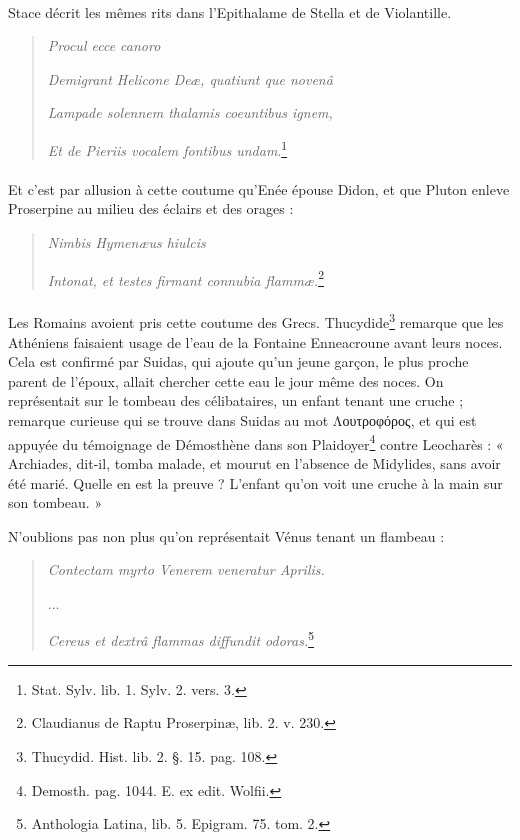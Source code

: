 \documentclass[a4paper, 11pt, oneside, polutonikogreek, french]{article}
\begin{document}
\paragraph{}
Stace décrit les mêmes rits dans l'Epithalame de Stella et de Violantille.
\begin{quotation}
\hspace*{10mm}\emph{Procul ecce canoro}

\emph{Demigrant Helicone Deæ, quatiunt que novenâ}

\emph{Lampade solennem thalamis coeuntibus ignem,}

\emph{Et de Pieriis vocalem fontibus undam}.\footnote{Stat. Sylv. lib. 1. Sylv. 2. vers. 3.}
\end{quotation}
\paragraph{}
Et c'est par allusion à cette coutume qu'Enée épouse Didon, et que Pluton enleve Proserpine au milieu des éclairs et des orages :
\begin{quotation}
\hspace*{10mm}\emph{Nimbis Hymenæus hiulcis}

\emph{Intonat, et testes firmant connubia flammæ.}\footnote{Claudianus de Raptu Proserpinæ, lib. 2. v. 230.}
\end{quotation}
\paragraph{}
Les Romains avoient pris cette coutume des Grecs. Thucydide\footnote{Thucydid. Hist. lib. 2. §. 15. pag. 108.} remarque que les Athéniens faisaient usage de l'eau de la Fontaine Enneacroune avant leurs noces. Cela est confirmé par Suidas, qui ajoute qu'un jeune garçon, le plus proche parent de l'époux, allait chercher cette eau le jour même des noces. On représentait sur le tombeau des célibataires, un enfant tenant une cruche ; remarque curieuse qui se trouve dans Suidas au mot Λουτροφόρος, et qui est appuyée du témoignage de Démosthène dans son Plaidoyer\footnote{Demosth. pag. 1044. E. ex edit. Wolfii.} contre Leocharès : « Archiades, dit-il, tomba malade, et mourut en l'absence de Midylides, sans avoir été marié. Quelle en est la preuve ? L'enfant qu'on voit une cruche à la main sur son tombeau. »

N'oublions pas non plus qu'on représentait Vénus tenant un flambeau :
\begin{quotation}
\emph{Contectam myrto Venerem veneratur Aprilis.}

...

\emph{Cereus et dextrâ flammas diffundit odoras.}\footnote{Anthologia Latina, lib. 5. Epigram. 75. tom. 2.}
\end{quotation}
\end{document}
